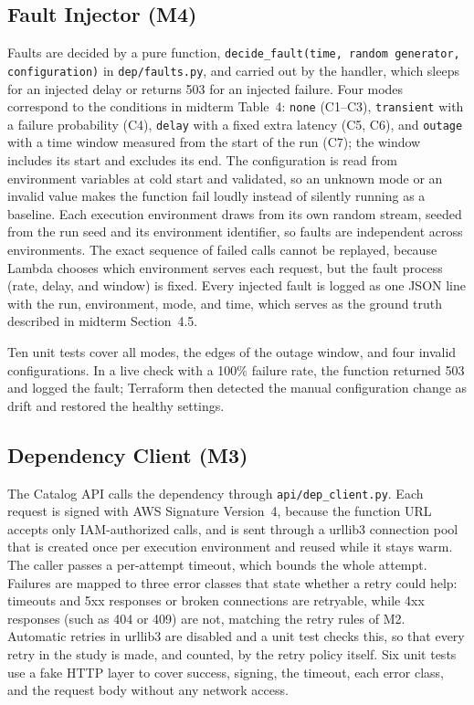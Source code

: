 \documentclass[10pt]{article}
\begin{document}
\subsection{Fault Injector (M4)}
Faults are decided by a pure function, \texttt{decide\_fault(time, random
generator, configuration)} in \texttt{dep/faults.py}, and carried out by the
handler, which sleeps for an injected delay or returns 503 for an injected
failure. Four modes correspond to the conditions in midterm Table~4:
\texttt{none} (C1--C3), \texttt{transient} with a failure probability (C4),
\texttt{delay} with a fixed extra latency (C5, C6), and \texttt{outage} with a
time window measured from the start of the run (C7); the window includes its
start and excludes its end. The configuration is read from environment variables
at cold start and validated, so an unknown mode or an invalid value makes the
function fail loudly instead of silently running as a baseline. Each execution
environment draws from its own random stream, seeded from the run seed and its
environment identifier, so faults are independent across environments. The
exact sequence of failed calls cannot be replayed, because Lambda chooses which
environment serves each request, but the fault process (rate, delay, and window)
is fixed. Every injected fault is logged as one JSON line with the run,
environment, mode, and time, which serves as the ground truth described in
midterm Section~4.5.

Ten unit tests cover all modes, the edges of the outage window, and four invalid
configurations. In a live check with a 100\% failure rate, the function returned
503 and logged the fault; Terraform then detected the manual configuration
change as drift and restored the healthy settings.

\subsection{Dependency Client (M3)}
The Catalog API calls the dependency through \texttt{api/dep\_client.py}. Each
request is signed with AWS Signature Version~4, because the function URL accepts
only IAM-authorized calls, and is sent through a urllib3 connection pool that is
created once per execution environment and reused while it stays warm. The caller
passes a per-attempt timeout, which bounds the whole attempt. Failures are mapped
to three error classes that state whether a retry could help: timeouts and 5xx
responses or broken connections are retryable, while 4xx responses (such as 404
or 409) are not, matching the retry rules of M2. Automatic retries in urllib3
are disabled and a unit test checks this, so that every retry in the study is
made, and counted, by the retry policy itself. Six unit tests use a fake HTTP
layer to cover success, signing, the timeout, each error class, and the request
body without any network access.
\end{document}
